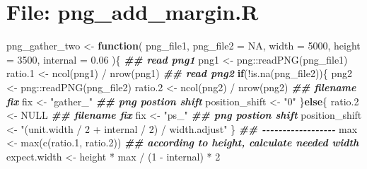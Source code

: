 \documentclass[
]{article}
\newenvironment{Shaded}{\begin{snugshade}}{\end{snugshade}}
\newcommand{\AttributeTok}[1]{\textcolor[rgb]{0.77,0.63,0.00}{#1}}
\newcommand{\ConstantTok}[1]{\textcolor[rgb]{0.00,0.00,0.00}{#1}}
\newcommand{\ControlFlowTok}[1]{\textcolor[rgb]{0.13,0.29,0.53}{\textbf{#1}}}
\newcommand{\DecValTok}[1]{\textcolor[rgb]{0.00,0.00,0.81}{#1}}
\newcommand{\DocumentationTok}[1]{\textcolor[rgb]{0.56,0.35,0.01}{\textbf{\textit{#1}}}}
\newcommand{\FloatTok}[1]{\textcolor[rgb]{0.00,0.00,0.81}{#1}}
\newcommand{\FunctionTok}[1]{\textcolor[rgb]{0.00,0.00,0.00}{#1}}
\newcommand{\NormalTok}[1]{#1}
\newcommand{\OtherTok}[1]{\textcolor[rgb]{0.56,0.35,0.01}{#1}}
\newcommand{\SpecialCharTok}[1]{\textcolor[rgb]{0.00,0.00,0.00}{#1}}
\newcommand{\StringTok}[1]{\textcolor[rgb]{0.31,0.60,0.02}{#1}}
\begin{document}
\hypertarget{file-png_add_margin.r}{%
\section{File: png\_add\_margin.R}\label{file-png_add_margin.r}}

\begin{Shaded}
\begin{Highlighting}[]
\NormalTok{png\_gather\_two }\OtherTok{\textless{}{-}} 
  \ControlFlowTok{function}\NormalTok{(}
\NormalTok{           png\_file1,}
           \AttributeTok{png\_file2 =} \ConstantTok{NA}\NormalTok{,}
           \AttributeTok{width =} \DecValTok{5000}\NormalTok{,}
           \AttributeTok{height =} \DecValTok{3500}\NormalTok{,}
           \AttributeTok{internal =} \FloatTok{0.06}
\NormalTok{           )\{}
    \DocumentationTok{\#\# read png1}
\NormalTok{    png1 }\OtherTok{\textless{}{-}}\NormalTok{ png}\SpecialCharTok{::}\FunctionTok{readPNG}\NormalTok{(png\_file1)}
\NormalTok{    ratio}\FloatTok{.1} \OtherTok{\textless{}{-}} \FunctionTok{ncol}\NormalTok{(png1) }\SpecialCharTok{/} \FunctionTok{nrow}\NormalTok{(png1)}
    \DocumentationTok{\#\# read png2}
    \ControlFlowTok{if}\NormalTok{(}\SpecialCharTok{!}\FunctionTok{is.na}\NormalTok{(png\_file2))\{}
\NormalTok{      png2 }\OtherTok{\textless{}{-}}\NormalTok{ png}\SpecialCharTok{::}\FunctionTok{readPNG}\NormalTok{(png\_file2)}
\NormalTok{      ratio}\FloatTok{.2} \OtherTok{\textless{}{-}} \FunctionTok{ncol}\NormalTok{(png2) }\SpecialCharTok{/} \FunctionTok{nrow}\NormalTok{(png2)}
      \DocumentationTok{\#\# filename fix}
\NormalTok{      fix }\OtherTok{\textless{}{-}} \StringTok{"gather\_"}
      \DocumentationTok{\#\# png postion shift}
\NormalTok{      position\_shift }\OtherTok{\textless{}{-}} \StringTok{"0"}
\NormalTok{    \}}\ControlFlowTok{else}\NormalTok{\{}
\NormalTok{      ratio}\FloatTok{.2} \OtherTok{\textless{}{-}} \ConstantTok{NULL}
      \DocumentationTok{\#\# filename fix}
\NormalTok{      fix }\OtherTok{\textless{}{-}} \StringTok{"ps\_"}
      \DocumentationTok{\#\# png postion shift}
\NormalTok{      position\_shift }\OtherTok{\textless{}{-}} \StringTok{"(unit.width / 2 + internal / 2) / width.adjust"}
\NormalTok{    \}}
    \DocumentationTok{\#\# {-}{-}{-}{-}{-}{-}{-}{-}{-}{-}{-}{-}{-}{-}{-}{-}{-}{-} }
\NormalTok{    max }\OtherTok{\textless{}{-}} \FunctionTok{max}\NormalTok{(}\FunctionTok{c}\NormalTok{(ratio}\FloatTok{.1}\NormalTok{, ratio}\FloatTok{.2}\NormalTok{))}
    \DocumentationTok{\#\# according to height, calculate needed width}
\NormalTok{    expect.width }\OtherTok{\textless{}{-}}\NormalTok{ height }\SpecialCharTok{*}\NormalTok{ max }\SpecialCharTok{/}\NormalTok{ (}\DecValTok{1} \SpecialCharTok{{-}}\NormalTok{ internal) }\SpecialCharTok{*} \DecValTok{2}

\end{Highlighting}
\end{Shaded}
\end{document}
